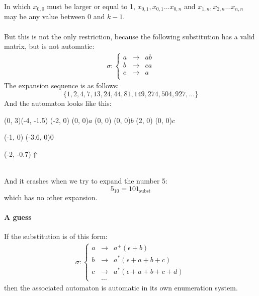 \documentclass{article}
\begin{document}
In which $x_{0, 0}$ must be larger or equal to 1, 
$x_{0, 1}, x_{0, 1} \ldots x_{0, n}$ and $x_{1, n}, x_{2, n} \ldots x_{n, n}$ 
may be any value between 0 and $k - 1$.\\
\\
But this is not the only restriction, because the following substitution has
a valid matrix, but is not automatic:
\begin{eqnarray*}
\sigma: \left\{ \begin{array}{lll}
a &\rightarrow& ab\\
b &\rightarrow& ca\\
c &\rightarrow& a\\
\end{array} \right.
\end{eqnarray*}
The expansion sequence is as follows:
\begin{displaymath}
\{1, 2, 4, 7, 13, 24, 44, 81, 149, 274, 504, 927, \ldots \}
\end{displaymath}
And the automaton looks like this:\\
\begin{graph}(0, 3)(-4, -1.5)
  (-2, 0) (0, 0){$a$}
  (0, 0)  (0, 0){$b$}
  (2, 0)  (0, 0){$c$}

  (-1, 0) \freetext(-3.6, 0){0}
   
   
   
   

  \freetext(-2, -0.7){$\Uparrow$}
\end{graph}\\
And it crashes when we try to expand the number 5:
\begin{displaymath}
5_{10} = 101_{\mathrm{subst}}
\end{displaymath}
which has no other expansion.

\paragraph{A guess}
If the substitution is of this form:
\begin{eqnarray*}
\sigma: \left\{ \begin{array}{lll}
a &\rightarrow& a^+ (\epsilon + b)\\
b &\rightarrow& a^* (\epsilon + a + b + c)\\
c &\rightarrow& a^* (\epsilon + a + b + c + d)\\
  &\ldots     &
\end{array} \right.
\end{eqnarray*}
then the associated automaton is automatic in its own enumeration system.
\end{document}
